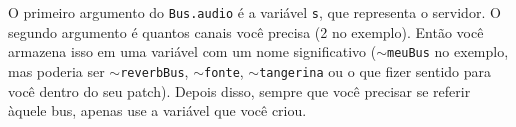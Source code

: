 O primeiro argumento do \texttt{Bus.audio} é a variável \texttt{s}, que representa o servidor. O segundo argumento é quantos canais você precisa (2 no exemplo). Então você armazena isso em uma variável com um nome significativo (\texttt{$\sim$meuBus} no exemplo, mas poderia ser \texttt{$\sim$reverbBus}, \texttt{$\sim$fonte}, \texttt{$\sim$tangerina} ou o que fizer sentido para você dentro do seu patch). Depois disso, sempre que você precisar se referir àquele bus, apenas use a variável que você criou.
